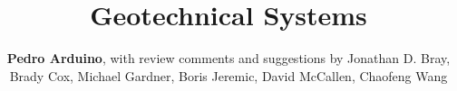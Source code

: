 %
%
%


%
%
%
%
%
%
%
%

\title{Geotechnical Systems}
\author{
    \textbf{Pedro Arduino},
    \newline
    with review comments and suggestions by Jonathan D. Bray, Brady Cox, Michael Gardner, Boris Jeremic, David McCallen, Chaofeng Wang
}
\tocauthor{}
%
%
\maketitle
\label{chapter:res_geotech}

